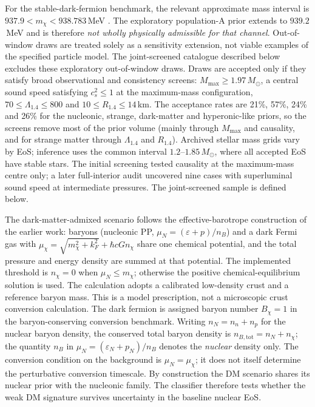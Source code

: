 \documentclass[11pt,a4paper]{article}
\newcommand{\Msun}{M_\odot}
\begin{document}
For the stable-dark-fermion benchmark, the relevant approximate mass interval is $937.9<m_\chi<938.783$\,MeV \citep{FG18}. The exploratory population-A prior extends to $939.2$\,MeV and is therefore \emph{not wholly physically admissible for that channel}. Out-of-window draws are treated solely as a sensitivity extension, not viable examples of the specified particle model. The joint-screened catalogue described below excludes these exploratory out-of-window draws.
Draws are accepted only if they satisfy broad observational and consistency screens: $M_{\max}\ge1.97\,\Msun$, a central sound speed satisfying $c_s^2\le1$ at the maximum-mass configuration, $70\le\Lambda_{1.4}\le800$ and $10\le R_{1.4}\le14$\,km. The acceptance rates are 21\%, 57\%, 24\% and 26\% for the nucleonic, strange, dark-matter and hyperonic-like priors, so the screens remove most of the prior volume (mainly through $M_{\max}$ and causality, and for strange matter through $\Lambda_{1.4}$ and $R_{1.4}$). Archived stellar mass grids vary by EoS; inference uses the common interval $1.2$--$1.85\,\Msun$, where all accepted EoS have stable stars. The initial screening tested causality at the maximum-mass centre only; a later full-interior audit uncovered nine cases with superluminal sound speed at intermediate pressures. The joint-screened sample is defined below.

The dark-matter-admixed scenario follows the effective-barotrope construction of the earlier work: baryons (nucleonic PP, $\mu_N=(\varepsilon+p)/n_B$) and a dark Fermi gas with $\mu_\chi=\sqrt{m_\chi^2+k_F^2}+\hbar cGn_\chi$ share one chemical potential, and the total pressure and energy density are summed at that potential. The implemented threshold is $n_\chi=0$ when $\mu_N\le m_\chi$; otherwise the positive chemical-equilibrium solution is used. The calculation adopts a calibrated low-density crust and a reference baryon mass. This is a model prescription, not a microscopic crust conversion calculation. The dark fermion is assigned baryon number $B_\chi=1$ in the baryon-conserving conversion benchmark. Writing $n_N=n_n+n_p$ for the nuclear baryon density, the conserved total baryon density is $n_{B,\mathrm{tot}}=n_N+n_\chi$; the quantity $n_B$ in $\mu_N=(\varepsilon_N+p_N)/n_B$ denotes the \emph{nuclear} density only. The conversion condition on the background is $\mu_N=\mu_\chi$; it does not itself determine the perturbative conversion timescale. By construction the DM scenario shares its nuclear prior with the nucleonic family. The classifier therefore tests whether the weak DM signature survives uncertainty in the baseline nuclear EoS.
\end{document}
